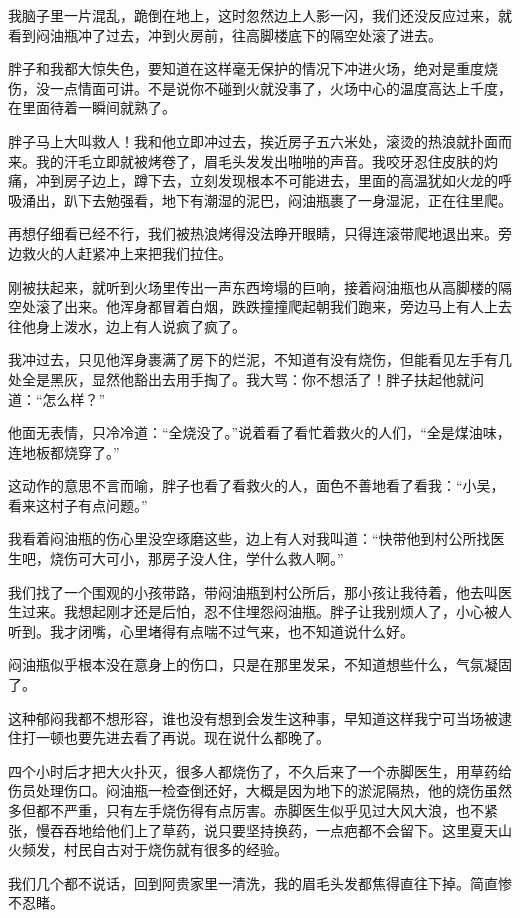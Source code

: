 我脑子里一片混乱，跪倒在地上，这时忽然边上人影一闪，我们还没反应过来，就看到闷油瓶冲了过去，冲到火房前，往高脚楼底下的隔空处滚了进去。

胖子和我都大惊失色，要知道在这样毫无保护的情况下冲进火场，绝对是重度烧伤，没一点情面可讲。不是说你不碰到火就没事了，火场中心的温度高达上千度，在里面待着一瞬间就熟了。

胖子马上大叫救人！我和他立即冲过去，挨近房子五六米处，滚烫的热浪就扑面而来。我的汗毛立即就被烤卷了，眉毛头发发出啪啪的声音。我咬牙忍住皮肤的灼痛，冲到房子边上，蹲下去，立刻发现根本不可能进去，里面的高温犹如火龙的呼吸涌出，趴下去勉强看，地下有潮湿的泥巴，闷油瓶裹了一身湿泥，正在往里爬。

再想仔细看已经不行，我们被热浪烤得没法睁开眼睛，只得连滚带爬地退出来。旁边救火的人赶紧冲上来把我们拉住。

刚被扶起来，就听到火场里传出一声东西垮塌的巨响，接着闷油瓶也从高脚楼的隔空处滚了出来。他浑身都冒着白烟，跌跌撞撞爬起朝我们跑来，旁边马上有人上去往他身上泼水，边上有人说疯了疯了。

我冲过去，只见他浑身裹满了房下的烂泥，不知道有没有烧伤，但能看见左手有几处全是黑灰，显然他豁出去用手掏了。我大骂：你不想活了！胖子扶起他就问道：“怎么样？”

他面无表情，只冷冷道：“全烧没了。”说着看了看忙着救火的人们，“全是煤油味，连地板都烧穿了。”

这动作的意思不言而喻，胖子也看了看救火的人，面色不善地看了看我：“小吴，看来这村子有点问题。”

我看着闷油瓶的伤心里没空琢磨这些，边上有人对我叫道：“快带他到村公所找医生吧，烧伤可大可小，那房子没人住，学什么救人啊。”

我们找了一个围观的小孩带路，带闷油瓶到村公所后，那小孩让我待着，他去叫医生过来。我想起刚才还是后怕，忍不住埋怨闷油瓶。胖子让我别烦人了，小心被人听到。我才闭嘴，心里堵得有点喘不过气来，也不知道说什么好。

闷油瓶似乎根本没在意身上的伤口，只是在那里发呆，不知道想些什么，气氛凝固了。

这种郁闷我都不想形容，谁也没有想到会发生这种事，早知道这样我宁可当场被逮住打一顿也要先进去看了再说。现在说什么都晚了。

四个小时后才把大火扑灭，很多人都烧伤了，不久后来了一个赤脚医生，用草药给伤员处理伤口。闷油瓶一检查倒还好，大概是因为地下的淤泥隔热，他的烧伤虽然多但都不严重，只有左手烧伤得有点厉害。赤脚医生似乎见过大风大浪，也不紧张，慢吞吞地给他们上了草药，说只要坚持换药，一点疤都不会留下。这里夏天山火频发，村民自古对于烧伤就有很多的经验。

我们几个都不说话，回到阿贵家里一清洗，我的眉毛头发都焦得直往下掉。简直惨不忍睹。


